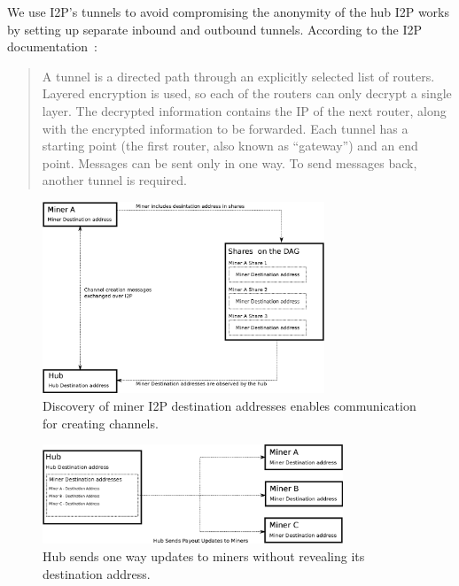 \documentclass{article}
\begin{document}
We use I2P's tunnels to avoid compromising the anonymity of the hub
I2P works by setting up separate inbound and outbound
tunnels. According to the I2P documentation~\cite{i2p-tech-intro}:

\begin{quote}
  A tunnel is a directed path through an explicitly selected list of
  routers. Layered encryption is used, so each of the routers can only
  decrypt a single layer. The decrypted information contains the IP of
  the next router, along with the encrypted information to be
  forwarded. Each tunnel has a starting point (the first router, also
  known as ``gateway'') and an end point. Messages can be sent only in
  one way. To send messages back, another tunnel is required.
\end{quote}

\begin{figure}
  \begin{center}
    \includegraphics[width=0.75\textwidth]{new-miner-communication.eps}
    \caption{Discovery of miner I2P destination addresses enables
      communication for creating channels.}\label{fig:new-miner-communication}
  \end{center}
\end{figure}

\begin{figure}
  \begin{center}
    \includegraphics[width=0.8\textwidth]{payout-communication.eps}
    \caption{Hub sends one way updates to miners without revealing its
      destination address.}\label{fig:new-miner-communication}
  \end{center}
\end{figure}
\end{document}
